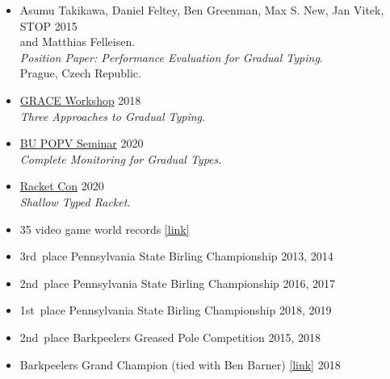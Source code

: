 \documentclass{article}
\begin{document}
\begin{itemize}
\item
  Asumu Takikawa, Daniel Feltey, Ben Greenman, Max S. New, Jan Vitek, \hfill STOP 2015 \\
   and Matthias Felleisen. \\
   \emph{Position Paper: Performance Evaluation for Gradual Typing}. \\
  Prague, Czech Republic.
\end{itemize}


\begin{itemize}
  \item
    \href{https://2018.splashcon.org/track/grace-2018-papers}{GRACE Workshop} \hfill 2018\\
    \emph{Three Approaches to Gradual Typing}.
  \item
    \href{https://www.bu.edu/cs/research/popv/seminar/}{BU POPV Seminar} \hfill {2020}\\
    \emph{Complete Monitoring for Gradual Types}.
  \item
    \href{https://con.racket-lang.org/2020}{Racket Con} \hfill 2020\\
    \emph{Shallow Typed Racket}.
\end{itemize}



\begin{itemize}
  \item 35 video game world records \href{https://www.twingalaxies.com/scores.php?player=43761}{[link]} \hfill {}
  \item 3rd~place Pennsylvania State Birling Championship \hfill 2013, 2014
  \item 2nd~place Pennsylvania State Birling Championship \hfill 2016, 2017
  \item 1st~place Pennsylvania State Birling Championship \hfill 2018, 2019
  \item 2nd~place Barkpeelers Greased Pole Competition \hfill 2015, 2018
  \item Barkpeelers Grand Champion (tied with Ben Barner) \href{http://lumbermuseum.org/bark-peeler-festival/festival-events-2019/bark-peeler-festival-2018/}{[link]} \hfill 2018
\end{itemize}
\end{document}
